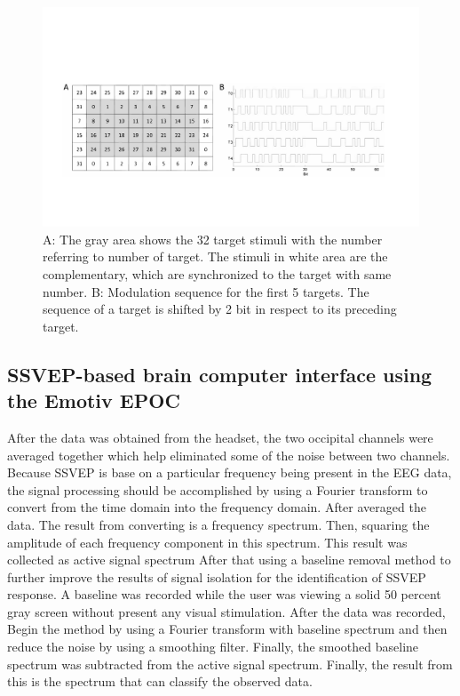 \begin{figure}[h]
	\centering
  	\includegraphics[scale = 0.5]{chapter2/25.pdf}
  	\caption{A: The gray area shows the 32 target stimuli with the number referring to number of  target. The stimuli in white area are the complementary, which are synchronized to the target with same number. B: Modulation sequence for the first 5 targets. The sequence of a target is shifted by 2 bit in respect to its preceding target.}
\end{figure}

\subsection {SSVEP-based brain computer interface using the Emotiv EPOC\cite{ref6}}

\hspace{1.5cm} After the data was obtained from the headset, the two occipital channels were averaged together which help eliminated some of the noise between two channels. Because SSVEP is base on a particular frequency being present in the EEG data, the signal processing should be accomplished by using a Fourier transform to convert from the time domain into the frequency domain. After averaged the data. The result from converting is a frequency spectrum. Then, squaring the amplitude of each frequency component in this spectrum. This result was collected as active signal spectrum After that using a baseline removal method to further improve the results of signal isolation for the identification of SSVEP response. A baseline was recorded while the user was viewing a solid 50 percent gray screen without present any visual stimulation. After the data was recorded, Begin the method by using a Fourier transform with baseline spectrum and then reduce the noise by using a smoothing filter. Finally, the smoothed baseline spectrum was subtracted from the active signal spectrum. Finally, the result from this is the spectrum that can classify the observed data.\\ 

